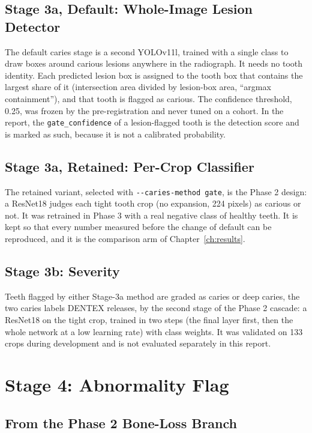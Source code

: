 \subsection{Stage 3a, Default: Whole-Image Lesion Detector}

The default caries stage is a second YOLOv11l, trained with a single class to draw boxes around
carious lesions anywhere in the radiograph. It needs no tooth identity. Each predicted lesion box is
assigned to the tooth box that contains the largest share of it (intersection area divided by
lesion-box area, ``argmax containment''), and that tooth is flagged as carious. The confidence
threshold, 0.25, was frozen by the pre-registration and never tuned on a cohort. In the report, the
\texttt{gate\_confidence} of a lesion-flagged tooth is the detection score and is marked as such,
because it is not a calibrated probability.

\subsection{Stage 3a, Retained: Per-Crop Classifier}

The retained variant, selected with \texttt{-{}-caries-method gate}, is the Phase 2 design: a ResNet18
judges each tight tooth crop (no expansion, 224 pixels) as carious or not. It was retrained in Phase 3
with a real negative class of healthy teeth. It is kept so that every number measured before the
change of default can be reproduced, and it is the comparison arm of Chapter~\ref{ch:results}.

\subsection{Stage 3b: Severity}

Teeth flagged by either Stage-3a method are graded as caries or deep caries, the two caries labels
DENTEX releases, by the second stage of the Phase 2 cascade: a ResNet18 on the tight crop, trained in
two steps (the final layer first, then the whole network at a low learning rate) with class weights.
It was validated on 133 crops during development and is not evaluated separately in this report.

\section{Stage 4: Abnormality Flag}
\label{sec:sys-stage4}

\subsection{From the Phase 2 Bone-Loss Branch}

